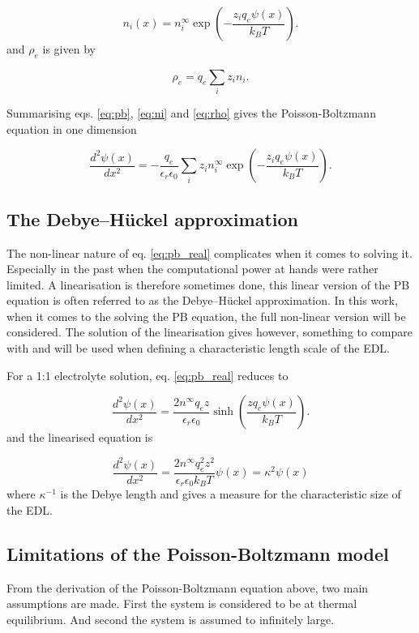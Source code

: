 \begin{equation}\label{eq:ni}
n_i(x) = n_i^{\infty} \exp\left(-\frac{z_i q_e \psi(x)}{k_BT}\right).
\end{equation}
and $\rho_e$ is given by

\begin{equation}\label{eq:rho}
\rho_e = q_e\sum_i z_i n_i.
\end{equation}

Summarising eqs. \eqref{eq:pb}, \eqref{eq:ni} and \eqref{eq:rho} gives
the Poisson-Boltzmann equation in one dimension

\begin{equation}\label{eq:pb_real}
\frac{d^2\psi(x)}{dx^2} = -\frac{q_e}{\epsilon_r \epsilon_0}\sum_i z_i
n_i^{\infty} \exp\left(-\frac{z_i q_e \psi(x)}{k_BT}\right).
\end{equation}

\subsection{The Debye–Hückel approximation}
The non-linear nature of eq. \eqref{eq:pb_real} complicates when it
comes to solving it. Especially in the past when the computational power
at hands were rather limited. A linearisation is therefore sometimes
done, this linear version of the PB equation is often referred to as
the Debye–Hückel approximation. In this work, when it comes to the
solving the PB equation, the full non-linear version will be
considered. The solution of the linearisation gives however, something
to compare with and will be used when defining a characteristic length
scale of the EDL.

For a 1:1 electrolyte solution, eq. \eqref{eq:pb_real} reduces to

\begin{equation}
\frac{d^2\psi(x)}{dx^2} = \frac{2n^{\infty}q_ez}{\epsilon_r
  \epsilon_0}
\sinh\left(\frac{z q_e \psi(x)}{k_BT}\right).
\end{equation}
and the linearised equation is

\begin{equation}
\frac{d^2\psi(x)}{dx^2} = \frac{2n^{\infty}q_e^2z^2}{\epsilon_r
  \epsilon_0 k_B T} \psi(x) = \kappa^2 \psi(x)
\end{equation}
where $\kappa^{-1}$ is the Debye length and gives a measure for the
characteristic size of the EDL.

\subsection{Limitations of the Poisson-Boltzmann model}
From the derivation of the Poisson-Boltzmann equation above, two main
assumptions are made. First the system is considered to be at thermal
equilibrium. And second the system is assumed to infinitely large. 

